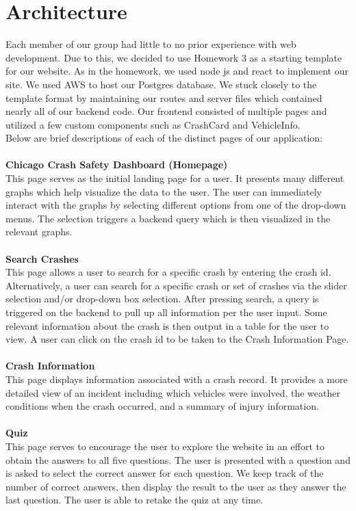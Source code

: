 \documentclass[12pt]{article}
\begin{document}
\section{Architecture}
Each member of our group had little to no prior experience with web development. Due to this, we decided to use Homework 3 as a starting template for our website. As in the homework, we used node js and react to implement our site. We used AWS to host our Postgres database. We stuck closely to the template format by maintaining our routes and server files which contained nearly all of our backend code. Our frontend consisted of multiple pages and utilized a few custom components such as CrashCard and VehicleInfo. 
\\
Below are brief descriptions of each of the distinct pages of our application:
\\ \\
\textbf{Chicago Crash Safety Dashboard (Homepage)} 
\\
This page serves as the initial landing page for a user. It presents many different graphs which help visualize the data to the user. The user can immediately interact with the graphs by selecting different options from one of the drop-down menus. The selection triggers a backend query which is then visualized in the relevant graphs.
\\ \\
\textbf{Search Crashes}
\\
This page allows a user to search for a specific crash by entering the crash id. Alternatively, a user can search for a specific crash or set of crashes via the slider selection and/or drop-down box selection. After pressing search, a query is triggered on the backend to pull up all information per the user input. Some relevant information about the crash is then output in a table for the user to view. A user can click on the crash id to be taken to the Crash Information Page.
\\  \\
\textbf{Crash Information} 
\\
This page displays information associated with a crash record. It provides a more detailed view of an incident including which vehicles were involved, the weather conditions when the crash occurred, and a summary of injury information. 
\\ \\
\textbf{Quiz}
\\
This page serves to encourage the user to explore the website in an effort to obtain the answers to all five questions. The user is presented with a question and is asked to select the correct answer for each question. We keep track of the number of correct answers, then display the result to the user as they answer the last question. The user is able to retake the quiz at any time. 
\end{document}
